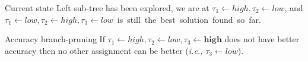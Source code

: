\documentclass[svgnames,unknownkeysallowed]{beamer}
\begin{document}
\begin{frame}
\begin{tikzpicture}
	\end{tikzpicture}
	
	
	\begin{block}{Current state}
		Left sub-tree has been explored, we are at $\tau_1\gets high, \tau_2\gets low$, and\\ 
		\mbox{$\tau_1 \gets low, \tau_2\gets high, \tau_3 \gets low$ is still the best solution found so~far.}
	\end{block}
	
	\begin{block}{Accuracy branch-pruning}
		If $\tau_1 \gets high, \tau_2\gets low, \tau_3 \gets \textbf{high}$ does not have better accuracy then no other assignment can be better (\emph{i.e.,} $\tau_3 \gets low$).
	\end{block}
	
\end{frame}
\end{document}
